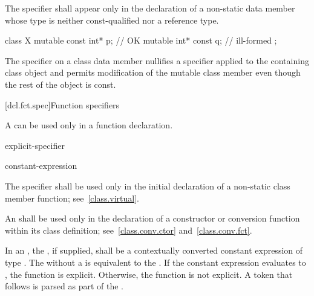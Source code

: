 \pnum
The  specifier shall appear only in the declaration of
a non-static data member
whose type is neither const-qualified nor a reference type.
\begin{example}
\begin{codeblock}
class X {
  mutable const int* p;         // OK
  mutable int* const q;         // ill-formed
};
\end{codeblock}
\end{example}

\pnum
The  specifier on a class data member nullifies a
 specifier applied to the containing class object and
permits modification of the mutable class member even though the rest of
the object is const.

[dcl.fct.spec]{Function specifiers}%
%

\pnum
A
can be used only in a function declaration.

\begin{bnf}
\br
    \br
    explicit-specifier
\end{bnf}

\begin{bnf}
\br
     \terminal{(} constant-expression \terminal{)}\br
\end{bnf}

\pnum
{}%
The  specifier shall be used only in the initial
declaration of a non-static class member function;
see~\ref{class.virtual}.

\pnum
{}%
An  shall be used only in the declaration of
a constructor or conversion function within its class definition;
see~\ref{class.conv.ctor} and~\ref{class.conv.fct}.

\pnum
In an ,
the , if supplied, shall be a
contextually converted constant expression of type .
The  
without a  is equivalent to
the  .
If the constant expression evaluates to ,
the function is explicit. Otherwise, the function is not explicit.
A \tcode{(} token that follows  is parsed as
part of the .

